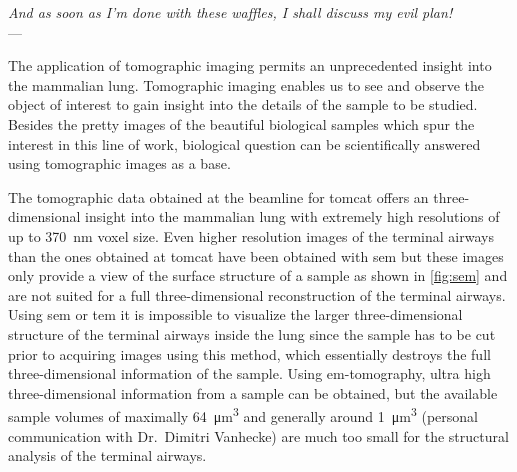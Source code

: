 \acresetall
{}\label{ch:discussion}
\begin{flushright}{\slshape And as soon as I'm done with these waffles, I shall discuss my evil plan!} \\ \medskip
	---  \citep{Zim}
\end{flushright}

\vfill

The application of tomographic imaging permits an unprecedented insight into the mammalian lung. Tomographic imaging enables us to see and observe the object of interest to gain insight into the details of the sample to be studied. Besides the pretty images of the beautiful biological samples which spur the interest in this line of work, biological question can be scientifically answered using tomographic images as a base.

The tomographic data obtained at the beamline for \ac{tomcat} offers an three-dimensional insight into the mammalian lung with extremely high resolutions of up to \SI{370}{\nano\meter} voxel size. Even higher resolution images of the terminal airways than the ones obtained at \ac{tomcat} have been obtained with \ac{sem} but these images only provide a view of the surface structure of a sample as shown in \autoref{fig:sem} and are not suited for a full three-dimensional reconstruction of the terminal airways. Using \ac{sem} or \ac{tem} it is impossible to visualize the larger three-dimensional structure of the terminal airways inside the lung since the sample has to be cut prior to acquiring images using this method, which essentially destroys the full three-dimensional information of the sample. Using \ac{em}-tomography, ultra high three-dimensional information from a sample can be obtained, but the available sample volumes of maximally \SI{64}{\micro\meter\cubed} and generally around \SI{1}{\micro\meter\cubed} (personal communication with Dr.\ Dimitri Vanhecke) are much too small for the structural analysis of the terminal airways.

